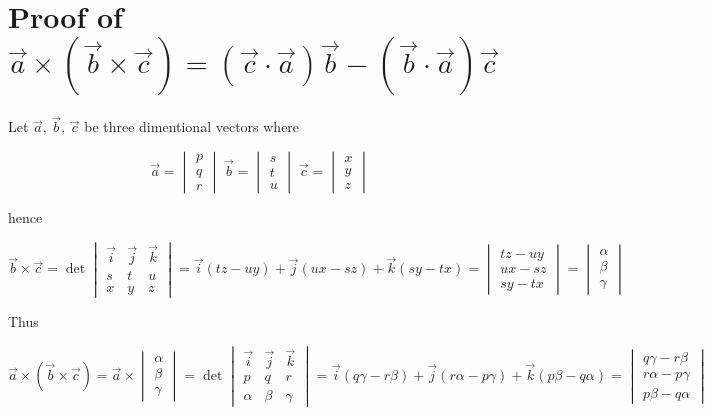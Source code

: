 \section{Proof of $\vec{a}\times(\vec{b}\times\vec{c}) = (\vec{c}\cdot\vec{a})\vec{b} - (\vec{b}\cdot\vec{a})\vec{c}$}

Let $\vec{a}$, $\vec{b}$, $\vec{c}$ be three dimentional vectors where

\[
    \vec{a} = \begin{vmatrix}
        p \\
        q \\
        r 
    \end{vmatrix} \;
    \vec{b} = \begin{vmatrix}
        s \\
        t \\
        u
    \end{vmatrix} \;
    \vec{c} = \begin{vmatrix}
        x \\
        y \\
        z
    \end{vmatrix}
\]

hence

\[
    \vec{b}\times\vec{c} = \det\begin{vmatrix}
        \vec{i} & \vec{j} & \vec{k} \\
        s & t & u \\
        x & y & z
    \end{vmatrix} = \vec{i}(tz-uy) + \vec{j}(ux-sz) + \vec{k}(sy-tx) = \begin{vmatrix}
        tz - uy \\
        ux - sz \\
        sy - tx
    \end{vmatrix} = \begin{vmatrix}
        \alpha \\
        \beta \\
        \gamma
    \end{vmatrix}
\]

Thus

\[
    \vec{a}\times(\vec{b}\times\vec{c}) = \vec{a}\times\begin{vmatrix}
        \alpha \\
        \beta \\
        \gamma
    \end{vmatrix} = \det\begin{vmatrix}
        \vec{i} & \vec{j} & \vec{k} \\
        p & q & r \\
        \alpha & \beta & \gamma
    \end{vmatrix} = \vec{i}(q\gamma - r\beta) + \vec{j}(r\alpha - p\gamma) + \vec{k}(p\beta - q\alpha) =
    \begin{vmatrix}
        q\gamma - r\beta \\
        r\alpha - p\gamma \\
        p\beta - q\alpha
    \end{vmatrix}
\]


